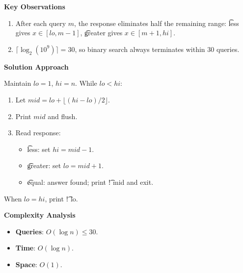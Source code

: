 \textbf{Key Observations}

\begin{enumerate}
    \item After each query $m$, the response eliminates half the remaining range:
          \t{less} gives $x \in [lo, m-1]$, \t{greater} gives $x \in [m+1, hi]$.
    \item $\lceil \log_2(10^9) \rceil = 30$, so binary search always terminates within $30$ queries.
\end{enumerate}

\textbf{Solution Approach}

Maintain $lo = 1$, $hi = n$. While $lo < hi$:
\begin{enumerate}
    \item Let $mid = lo + \lfloor (hi - lo) / 2 \rfloor$.
    \item Print $mid$ and flush.
    \item Read response:
    \begin{itemize}
        \item \t{less}: set $hi = mid - 1$.
        \item \t{greater}: set $lo = mid + 1$.
        \item \t{equal}: answer found; print \t{! mid} and exit.
    \end{itemize}
\end{enumerate}
When $lo = hi$, print \t{! lo}.

\textbf{Complexity Analysis}

\begin{itemize}
    \item \textbf{Queries}: $O(\log n) \leq 30$.
    \item \textbf{Time}: $O(\log n)$.
    \item \textbf{Space}: $O(1)$.
\end{itemize}
